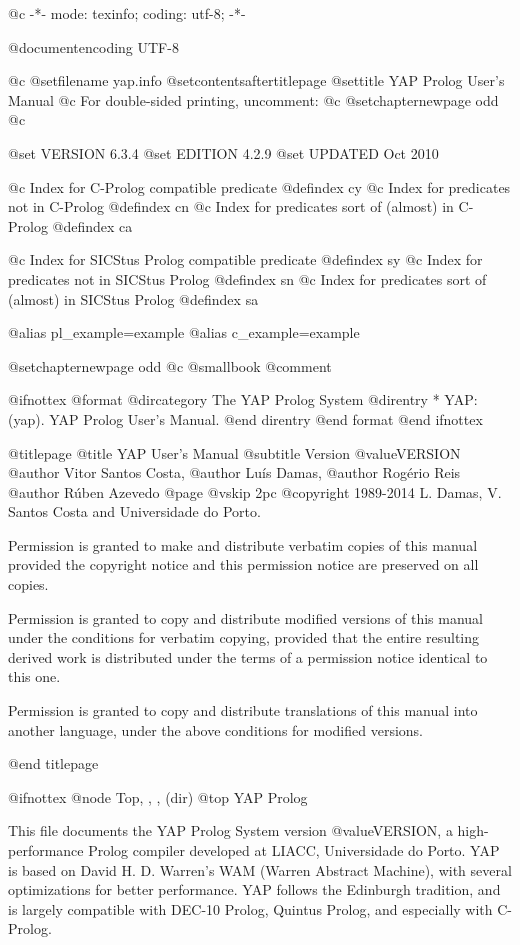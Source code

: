  @c -*- mode: texinfo; coding: utf-8; -*-

@documentencoding UTF-8

@c %
@setfilename yap.info
@setcontentsaftertitlepage
@settitle YAP Prolog User's Manual
@c For double-sided printing, uncomment:
@c @setchapternewpage odd
@c %

@set VERSION 6.3.4
@set EDITION 4.2.9
@set UPDATED Oct 2010

@c Index for C-Prolog compatible predicate
@defindex cy
@c Index for predicates not in C-Prolog
@defindex cn
@c Index for predicates sort of (almost) in C-Prolog
@defindex ca

@c Index for SICStus Prolog compatible predicate
@defindex sy
@c Index for predicates not in SICStus Prolog
@defindex sn
@c Index for predicates sort of (almost) in SICStus Prolog
@defindex sa

@alias pl_example=example 
@alias c_example=example 

@setchapternewpage odd
@c @smallbook
@comment %

@ifnottex
@format
@dircategory The YAP Prolog System
@direntry
* YAP: (yap).           YAP Prolog User's Manual.
@end direntry
@end format
@end ifnottex

@titlepage
@title YAP User's Manual
@subtitle Version @value{VERSION}
@author Vitor Santos Costa,
@author Luís Damas,
@author Rogério Reis
@author Rúben Azevedo
@page
@vskip 2pc
@copyright{} 1989-2014 L. Damas, V. Santos Costa and Universidade
do Porto.

Permission is granted to make and distribute verbatim copies of
this manual provided the copyright notice and this permission notice
are preserved on all copies.

Permission is granted to copy and distribute modified versions of this
manual under the conditions for verbatim copying, provided that the entire
resulting derived work is distributed under the terms of a permission
notice identical to this one.

Permission is granted to copy and distribute translations of this manual
into another language, under the above conditions for modified versions.

@end titlepage

@ifnottex
@node Top, , , (dir)
@top YAP Prolog

This file documents the YAP Prolog System version @value{VERSION}, a
high-performance Prolog compiler developed at LIACC, Universidade do
Porto. YAP is based on David H. D. Warren's WAM (Warren Abstract
Machine), with several optimizations for better performance. YAP follows
the Edinburgh tradition, and is largely compatible with DEC-10 Prolog,
Quintus Prolog, and especially with C-Prolog.


